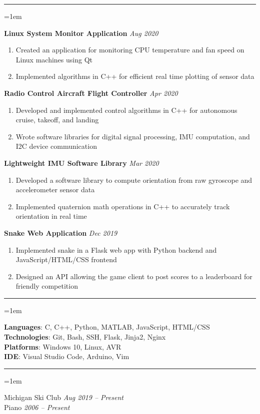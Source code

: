 \documentclass[12pt]{article}
\newcommand{\rheader}[1] { 
    \noindent{ 
        \large 
        \textbf{#1} 
        \par 
    }
    \vspace{-10pt}
    \noindent 
    \rule{7.5in}{0.5pt} 
}
\newcommand{\rdate}[1] {
    \hfill 
    \textit{#1}
}
\newcommand{\ritem} {
    \vspace{-10pt} 
    \item
}
\newenvironment{rsection} {
    \vspace{-5pt}
    \par 
    \medskip
    \leftskip=1em
    \noindent 
    \ignorespaces
} {
    \par 
    \medskip
    \vspace{5pt}
}
\newenvironment{rlist} {
    \begin{enumerate}[leftmargin=0.5in, label=$\bullet$]
} {
    \end{enumerate}
    \vspace{-10pt}
}
\begin{document}
\rheader{PROJECTS}
\begin{rsection}
    \textbf{Linux System Monitor Application} \rdate{Aug 2020}
    \begin{rlist}
        \ritem Created an application for monitoring CPU temperature and fan speed on Linux machines using Qt
        \ritem Implemented algorithms in C++ for efficient real time plotting of sensor data
    \end{rlist}
    \vspace{5pt}
    \textbf{Radio Control Aircraft Flight Controller}  \rdate{Apr 2020}
    \begin{rlist}
        \ritem Developed and implemented control algorithms in C++ for autonomous cruise, takeoff, and landing
        \ritem Wrote software libraries for digital signal processing, IMU computation, and I2C device communication
    \end{rlist}
    \vspace{5pt}
    \textbf{Lightweight IMU Software Library} \rdate{Mar 2020}
    \begin{rlist}
        \ritem Developed a software library to compute orientation from raw gyroscope and accelerometer sensor data
        \ritem Implemented quaternion math operations in C++ to accurately track orientation in real time
    \end{rlist}
    \vspace{5pt}
    \textbf{Snake Web Application} \rdate{Dec 2019}
    \begin{rlist}
        \ritem Implemented snake in a Flask web app with Python backend and JavaScript/HTML/CSS frontend
        \ritem Designed an API allowing the game client to post scores to a leaderboard for friendly competition
    \end{rlist}
\end{rsection}


\rheader{SKILLS}
\begin{rsection}
    \textbf{Languages}: C, C++, Python, MATLAB, JavaScript, HTML/CSS \\
    \textbf{Technologies}: Git, Bash, SSH, Flask, Jinja2, Nginx \\
    \textbf{Platforms}: Windows 10, Linux, AVR \\
    \textbf{IDE}: Visual Studio Code, Arduino, Vim
\end{rsection}


\rheader{ACTIVITIES}
\begin{rsection}
    Michigan Ski Club \rdate{Aug 2019 -- Present} \\
    Piano \rdate{2006 -- Present}
\end{rsection}
\end{document}
